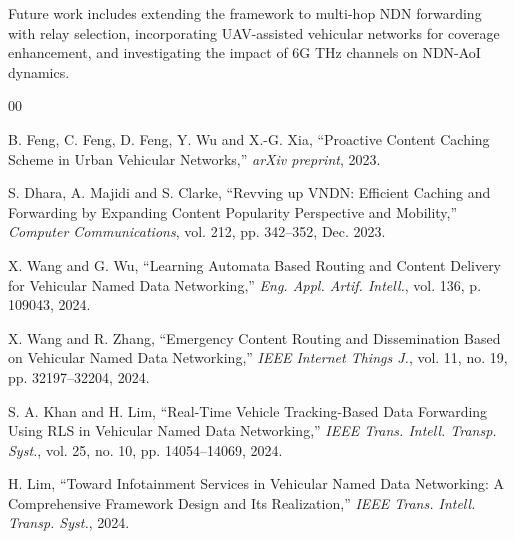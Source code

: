 \documentclass[journal]{IEEEtran}
\begin{document}
Future work includes extending the framework to multi-hop NDN forwarding with relay selection, incorporating UAV-assisted vehicular networks for coverage enhancement, and investigating the impact of 6G THz channels on NDN-AoI dynamics.

\begin{thebibliography}{00}



 B. Feng, C. Feng, D. Feng, Y. Wu and X.-G. Xia, ``Proactive Content Caching Scheme in Urban Vehicular Networks,'' \emph{arXiv preprint}, 2023.

 S. Dhara, A. Majidi and S. Clarke, ``Revving up VNDN: Efficient Caching and Forwarding by Expanding Content Popularity Perspective and Mobility,'' \emph{Computer Communications}, vol. 212, pp. 342--352, Dec. 2023.

 X. Wang and G. Wu, ``Learning Automata Based Routing and Content Delivery for Vehicular Named Data Networking,'' \emph{Eng. Appl. Artif. Intell.}, vol. 136, p. 109043, 2024.

 X. Wang and R. Zhang, ``Emergency Content Routing and Dissemination Based on Vehicular Named Data Networking,'' \emph{IEEE Internet Things J.}, vol. 11, no. 19, pp. 32197--32204, 2024.

 S. A. Khan and H. Lim, ``Real-Time Vehicle Tracking-Based Data Forwarding Using RLS in Vehicular Named Data Networking,'' \emph{IEEE Trans. Intell. Transp. Syst.}, vol. 25, no. 10, pp. 14054--14069, 2024.

 H. Lim, ``Toward Infotainment Services in Vehicular Named Data Networking: A Comprehensive Framework Design and Its Realization,'' \emph{IEEE Trans. Intell. Transp. Syst.}, 2024.


\end{thebibliography}
\end{document}
